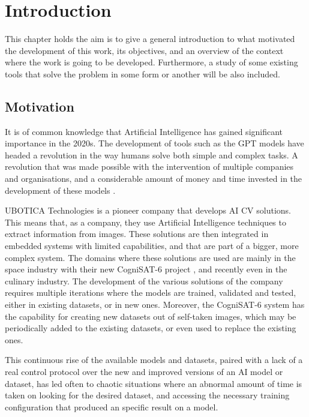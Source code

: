\chapter{Introduction}
\label{cap:Introduction}

This chapter holds the aim is to give a  general introduction to what motivated the development of this work, its objectives, and an
overview of the context where the work is going to be developed. Furthermore, a study of some existing tools that solve the problem in
some form or another will be also included.
\section{Motivation}

It is of common knowledge that Artificial Intelligence has gained significant importance in the 2020s. The development of tools such as the GPT models
have headed a revolution in the way humans solve both simple and complex tasks. A revolution that was made possible with the intervention of multiple
companies and organisations, and a considerable amount of money and time invested in the development of these models \cite{AIRise}.

UBOTICA Technologies is a pioneer company that develops \acrshort{AI} \acrfull{CV} solutions. This means that, as a company, they use Artificial Intelligence
techniques to extract information from images. These solutions are then integrated in embedded systems with limited capabilities, and that are part of a 
bigger, more complex system. The domains where these solutions are used are mainly in the space industry with their new CogniSAT-6 project \cite{UBOTICACS6}, 
and recently even in the culinary industry. The development of the various solutions of the company requires multiple iterations where the models are trained,
validated and tested, either in existing datasets, or in new ones. Moreover, the CogniSAT-6 system has the capability for creating new datasets out of self-taken
images, which may be periodically added to the existing datasets, or even used to replace the existing ones.

This continuous rise of the available models and datasets, paired with a lack of a real control protocol over the new and improved versions of an AI model or dataset,
has led often to chaotic situations where an abnormal amount of time is taken on looking for the desired dataset, and accessing the necessary training configuration
that produced an specific result on a model.

